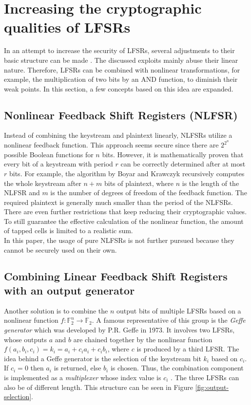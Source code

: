 
\section{Increasing the cryptographic qualities of LFSRs}

In an attempt to increase the security of LFSRs, several adjustments to their basic structure can be made \cite[p. 97]{Pommerening.2000}. The discussed exploits mainly abuse their linear nature. Therefore, LFSRs can be combined with nonlinear transformations, for example, the multiplication of two bits by an AND function, to diminish their weak points. In this section, a few concepts based on this idea are expanded.

\subsection{Nonlinear Feedback Shift Registers (NLFSR)}

Instead of combining the keystream and plaintext linearly, NLFSRs utilize a nonlinear feedback function. This approach seems secure since there are $2^{2^n}$ possible Boolean functions for $n$ bits. However, it is mathematically proven that every bit of a keystream with period $r$ can be correctly determined after at most $r$ bits. For example, the algorithm by Boyar and Krawczyk recursively computes the whole keystream after $n+m$ bits of plaintext, where $n$ is the length of the NLFSR and $m$ is the number of degrees of freedom of the feedback function. The required plaintext is generally much smaller than the period of the NLFSRs. There are even further restrictions that keep reducing their cryptographic values. To still guarantee the effective calculation of the nonlinear function, the amount of tapped cells is limited to a realistic sum. \cite{Pommerening.2015}   \\

In this paper, the usage of pure NLFSRs is not further pursued because they cannot be securely used on their own. \cite[p. 97]{Pommerening.2000}


\subsection{Combining Linear Feedback Shift Registers with an output generator}

Another solution is to combine the $n$ output bits of multiple LFSRs based on a nonlinear function $f: \mathbb{F}^n_2 \rightarrow \mathbb{F}_2$. A famous representative of this group is the \emph{Geffe generator} which was developed by P.R. Geffe in 1973. It involves two LFSRs, whose outputs $a$ and $b$ are chained together by the nonlinear function $f(a_i,b_i,c_i) = k_i = a_i+c_ia_i+c_ib_i $, where $c$ is produced by a third LFSR. The idea behind a Geffe generator is the selection of the keystream bit $k_i$ based on $c_i$. If $c_i=0$ then $a_i$ is returned, else $b_i$ is chosen. \cite{Handayani.2019} Thus, the combination component is implemented as a \emph{multiplexer} whose index value is $c_i$ \cite[p. 19]{Robshaw.1995}. The three LFSRs can also be of different length. This structure can be seen in Figure \ref{fig:output-selection}. 

